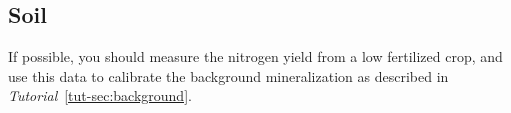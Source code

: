 \documentclass[a4paper,11pt,twoside]{article}
\newcommand{\daisytut}{\textit{\Daisy{} Tutorial}}
\begin{document}
\subsection{Soil}

If possible, you should measure the nitrogen yield from a low
fertilized crop, and use this data to calibrate the background
mineralization as described in \daisytut{}~\ref{tut-sec:background}.
\end{document}
